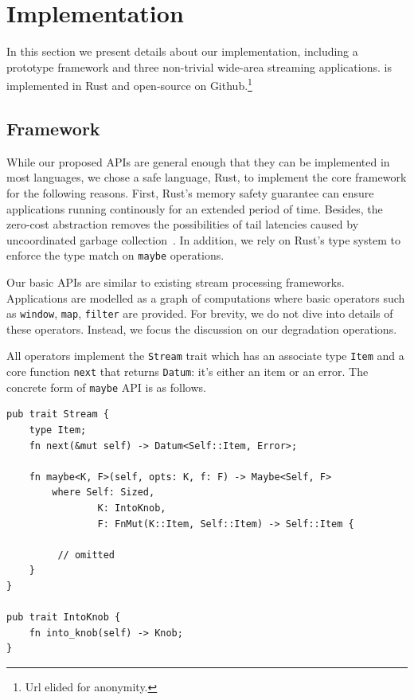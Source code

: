 \section{Implementation}
\label{sec:implementation}

In this section we present details about our implementation, including a
prototype framework and three non-trivial wide-area streaming applications.
\sysname{} is implemented in Rust and open-source on Github.\footnote{Url elided
  for anonymity.}

\subsection{Framework}
\label{sec:framework}

While our proposed APIs are general enough that they can be implemented in most
languages, we chose a safe language, Rust, to implement the core framework for
the following reasons. First, Rust's memory safety guarantee can ensure
applications running continously for an extended period of time. Besides, the
zero-cost abstraction removes the possibilities of tail latencies caused by
uncoordinated garbage collection~\cite{maas2016taurus}. In addition, we rely on
Rust's type system to enforce the type match on \texttt{maybe} operations.

Our basic APIs are similar to existing stream processing
frameworks. Applications are modelled as a graph of computations where basic
operators such as \texttt{window}, \texttt{map}, \texttt{filter} are provided.
For brevity, we do not dive into details of these operators. Instead, we focus
the discussion on our degradation operations.

All operators implement the \texttt{Stream} trait which has an associate type
\texttt{Item} and a core function \texttt{next} that returns \texttt{Datum}:
it's either an item or an error. The concrete form of \texttt{maybe} API is as
follows.

\begin{lstlisting}
pub trait Stream {
    type Item;
    fn next(&mut self) -> Datum<Self::Item, Error>;

    fn maybe<K, F>(self, opts: K, f: F) -> Maybe<Self, F>
        where Self: Sized,
                K: IntoKnob,
                F: FnMut(K::Item, Self::Item) -> Self::Item {

         // omitted
    }
}

pub trait IntoKnob {
    fn into_knob(self) -> Knob;
}
\end{lstlisting}


